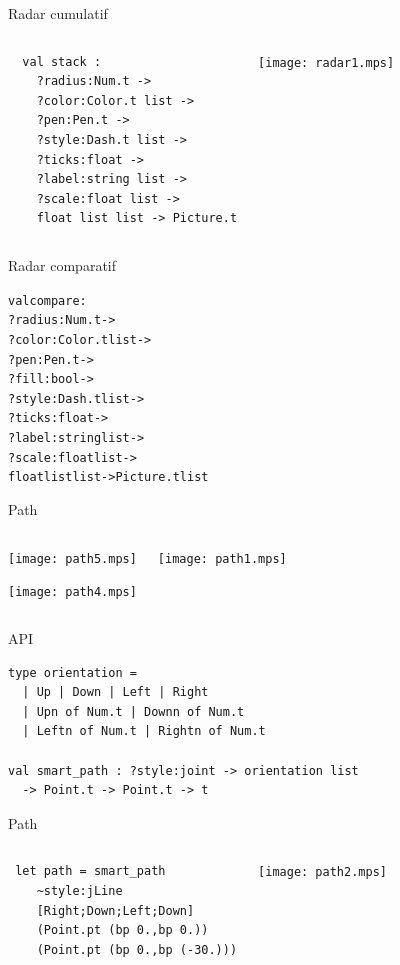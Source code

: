 \documentclass{beamer}
\begin{document}
\begin{frame}[fragile]{Radar cumulatif}
  \begin{columns}
\begin{verbatim}
  val stack :
    ?radius:Num.t ->
    ?color:Color.t list ->
    ?pen:Pen.t ->
    ?style:Dash.t list ->
    ?ticks:float ->
    ?label:string list ->
    ?scale:float list ->
    float list list -> Picture.t
\end{verbatim}
    \texttt{[image: radar1.mps]}
  \end{columns}
\end{frame}


\begin{frame}[fragile]{Radar comparatif}
\begin{alltt}
  val compare :
    ?radius:Num.t ->
    ?color:Color.t list ->
    ?pen:Pen.t ->
    \color{red}?fill:bool ->
\color{black}    ?style:Dash.t list ->
    ?ticks:float ->
    ?label:string list ->
    ?scale:float list ->
    float list list -> Picture.t \color{red}list
\end{alltt}
\end{frame}


\begin{frame}[fragile]{Path}
  \begin{columns}
    
    \bigskip
    \bigskip
    \begin{center}
    \texttt{[image: path5.mps]}
    \bigskip
    
    \texttt{[image: path4.mps]}
  \end{center}
    \texttt{[image: path1.mps]}
  \end{columns}
\end{frame}


\begin{frame}[fragile]{API}
\begin{verbatim}
type orientation = 
  | Up | Down | Left | Right
  | Upn of Num.t | Downn of Num.t 
  | Leftn of Num.t | Rightn of Num.t
  
val smart_path : ?style:joint -> orientation list 
  -> Point.t -> Point.t -> t
\end{verbatim}
\end{frame}


\begin{frame}[fragile]{Path}
  \begin{columns}
\begin{verbatim}
 let path = smart_path 
    ~style:jLine
    [Right;Down;Left;Down]
    (Point.pt (bp 0.,bp 0.)) 
    (Point.pt (bp 0.,bp (-30.)))
\end{verbatim}
    \texttt{[image: path2.mps]}
\end{columns}
\end{frame}
\end{document}
